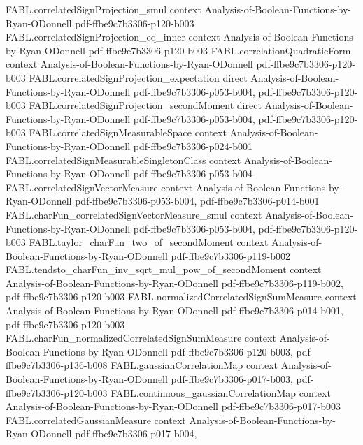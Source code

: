 \begin{theorem}
\proofstep
  {FABL.correlatedSignProjection_smul}
  {context}
  {Analysis-of-Boolean-Functions-by-Ryan-ODonnell}
  {pdf-ffbe9c7b3306-p120-b003}
\proofstep
  {FABL.correlatedSignProjection_eq_inner}
  {context}
  {Analysis-of-Boolean-Functions-by-Ryan-ODonnell}
  {pdf-ffbe9c7b3306-p120-b003}
\proofstep
  {FABL.correlationQuadraticForm}
  {context}
  {Analysis-of-Boolean-Functions-by-Ryan-ODonnell}
  {pdf-ffbe9c7b3306-p120-b003}
\proofstep
  {FABL.correlatedSignProjection_expectation}
  {direct}
  {Analysis-of-Boolean-Functions-by-Ryan-ODonnell}
  {pdf-ffbe9c7b3306-p053-b004,
    pdf-ffbe9c7b3306-p120-b003}
\proofstep
  {FABL.correlatedSignProjection_secondMoment}
  {direct}
  {Analysis-of-Boolean-Functions-by-Ryan-ODonnell}
  {pdf-ffbe9c7b3306-p053-b004,
    pdf-ffbe9c7b3306-p120-b003}
\proofstep
  {FABL.correlatedSignMeasurableSpace}
  {context}
  {Analysis-of-Boolean-Functions-by-Ryan-ODonnell}
  {pdf-ffbe9c7b3306-p024-b001}
\proofstep
  {FABL.correlatedSignMeasurableSingletonClass}
  {context}
  {Analysis-of-Boolean-Functions-by-Ryan-ODonnell}
  {pdf-ffbe9c7b3306-p053-b004}
\proofstep
  {FABL.correlatedSignVectorMeasure}
  {context}
  {Analysis-of-Boolean-Functions-by-Ryan-ODonnell}
  {pdf-ffbe9c7b3306-p053-b004,
    pdf-ffbe9c7b3306-p014-b001}
\proofstep
  {FABL.charFun_correlatedSignVectorMeasure_smul}
  {context}
  {Analysis-of-Boolean-Functions-by-Ryan-ODonnell}
  {pdf-ffbe9c7b3306-p053-b004,
    pdf-ffbe9c7b3306-p120-b003}
\proofstep
  {FABL.taylor_charFun_two_of_secondMoment}
  {context}
  {Analysis-of-Boolean-Functions-by-Ryan-ODonnell}
  {pdf-ffbe9c7b3306-p119-b002}
\proofstep
  {FABL.tendsto_charFun_inv_sqrt_mul_pow_of_secondMoment}
  {context}
  {Analysis-of-Boolean-Functions-by-Ryan-ODonnell}
  {pdf-ffbe9c7b3306-p119-b002,
    pdf-ffbe9c7b3306-p120-b003}
\proofstep
  {FABL.normalizedCorrelatedSignSumMeasure}
  {context}
  {Analysis-of-Boolean-Functions-by-Ryan-ODonnell}
  {pdf-ffbe9c7b3306-p014-b001,
    pdf-ffbe9c7b3306-p120-b003}
\proofstep
  {FABL.charFun_normalizedCorrelatedSignSumMeasure}
  {context}
  {Analysis-of-Boolean-Functions-by-Ryan-ODonnell}
  {pdf-ffbe9c7b3306-p120-b003,
    pdf-ffbe9c7b3306-p136-b008}
\proofstep
  {FABL.gaussianCorrelationMap}
  {context}
  {Analysis-of-Boolean-Functions-by-Ryan-ODonnell}
  {pdf-ffbe9c7b3306-p017-b003,
    pdf-ffbe9c7b3306-p120-b003}
\proofstep
  {FABL.continuous_gaussianCorrelationMap}
  {context}
  {Analysis-of-Boolean-Functions-by-Ryan-ODonnell}
  {pdf-ffbe9c7b3306-p017-b003}
\proofstep
  {FABL.correlatedGaussianMeasure}
  {context}
  {Analysis-of-Boolean-Functions-by-Ryan-ODonnell}
  {pdf-ffbe9c7b3306-p017-b004,
}
\end{theorem}
